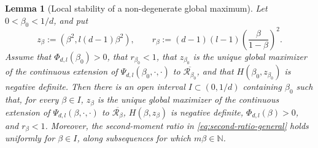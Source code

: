 \documentclass[11pt]{amsart}
\theoremstyle{plain}
\newtheorem{lemma}[theorem]{Lemma}
\numberwithin{equation}{section}
\numberwithin{theorem}{section}
\numberwithin{figure}{section}
\begin{document}
\begin{lemma}[Local stability of a non-degenerate global maximum]
\label{lem:local-stability-global-max}
Let \(0<\beta_0<1/d\), and put
\[
  z_\beta:=(\beta^2,l(d-1)\beta^2),\qquad
  r_\beta:=(d-1)(l-1)\left(\frac{\beta}{1-\beta}\right)^2 .
\]
Assume that \(\Phi_{d,l}(\beta_0)>0\), that \(r_{\beta_0}<1\), that
\(z_{\beta_0}\) is the unique global maximizer of the continuous extension of
\(\Psi_{d,l}(\beta_0,\cdot,\cdot)\) to \(\overline{\mathcal R_{\beta_0}}\), and that
\(H(\beta_0,z_{\beta_0})\) is negative definite.  Then there is an open interval
\(I\subset(0,1/d)\) containing \(\beta_0\) such that, for every \(\beta\in I\),
\(z_\beta\) is the unique global maximizer of the continuous extension of
\(\Psi_{d,l}(\beta,\cdot,\cdot)\) to \(\overline{\mathcal R_\beta}\),
\(H(\beta,z_\beta)\) is negative definite, \(\Phi_{d,l}(\beta)>0\), and
\(r_\beta<1\).  Moreover, the second-moment ratio in
\eqref{eq:second-ratio-general} holds uniformly for \(\beta\in I\), along
subsequences for which \(m\beta\in\mathbb N\).
\end{lemma}
\end{document}

